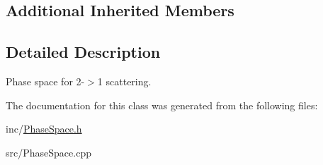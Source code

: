 \subsection*{Additional Inherited Members}


\subsection{Detailed Description}
Phase space for 2-\/$>$1 scattering. 

The documentation for this class was generated from the following files\-:\begin{DoxyCompactItemize}
\item 
inc/\hyperlink{PhaseSpace_8h}{Phase\-Space.\-h}\item 
src/Phase\-Space.\-cpp\end{DoxyCompactItemize}

